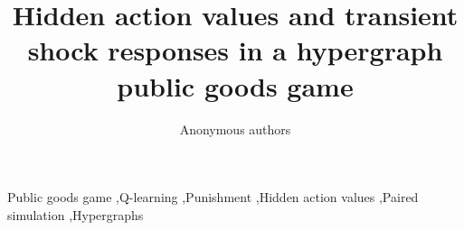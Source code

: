 \documentclass[5p,authoryear]{elsarticle}
\begin{document}
\begin{frontmatter}
\title{Hidden action values and transient shock responses in a hypergraph public goods game}
\author{Anonymous authors}
\begin{abstract}

\end{abstract}
\begin{keyword}
Public goods game \sep Q-learning \sep Punishment \sep Hidden action values \sep Paired simulation \sep Hypergraphs
\end{keyword}
\end{frontmatter}



\FloatBarrier

\appendix
\setcounter{figure}{0}
\setcounter{table}{0}

\FloatBarrier


\end{document}
